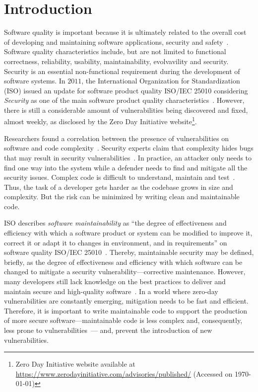 \documentclass[smallextended]{svjour3}       %
\begin{document}
\section{Introduction}
%
Software quality is important because it is ultimately related to 
the overall cost of developing and maintaining software 
applications, security and safety~\cite{slaughter1998evaluating}. Software quality 
characteristics include, but are not limited to functional 
correctness, reliability, usability, maintainability, evolvavility 
and security. Security is an essential non-functional requirement 
during the development of software systems. In $2011$, the 
International Organization for Standardization (ISO) issued an 
update for software product quality ISO/IEC 25010 considering 
\emph{Security} as one of the main software product quality 
characteristics~\cite{iso:2011}. However, there is still 
a considerable amount of vulnerabilities being discovered and fixed, 
almost weekly, as disclosed by the Zero Day Initiative 
website\footnote{Zero Day Initiative website available at 
\url{https://www.zerodayinitiative.com/advisories/published/} 
(Accessed on \today{})}. 

Researchers found a correlation between the presence of 
vulnerabilities on software and code complexity~\cite{shin2010evaluating,10.1145/1774088.1774504}. 
Security experts claim that complexity hides bugs that may result in 
security vulnerabilities~\cite{mcgraw2004software,schneier2006beyond}. In 
practice, an attacker only needs to find one way into the system 
while a defender needs to find and mitigate all the security issues. 
Complex code is difficult to understand, maintain and 
test~\cite{1702388}. Thus, the task of a developer gets harder as the 
codebase grows in size and complexity. But the risk can be minimized 
by writing clean and maintainable code. 

ISO describes \textit{software maintainability} as ``the degree of 
effectiveness and efficiency with which a software product or system 
can be modified to improve it, correct it or adapt it to changes in 
environment, and in requirements'' on software quality ISO/IEC 
25010~\cite{iso:2011}. Thereby, maintainable security may be 
defined, briefly, as the degree of effectiveness and efficiency with 
which software can be changed to mitigate a security 
vulnerability---corrective maintenance.
However, many developers still lack knowledge on the best 
practices to deliver and maintain secure and high-quality 
software~\cite{Pothamsetty:2005:SEL:1107622.1107635,8077802}. In a 
world where zero-day vulnerabilities are constantly emerging, 
mitigation needs to be fast and efficient. Therefore, it 
is important to write maintainable code to support the production of 
more secure software---maintainable code is less complex and, 
consequently, less prone to
vulnerabilities~\cite{shin2010evaluating,10.1145/1774088.1774504}---
and, prevent the introduction of new vulnerabilities. 
\end{document}
